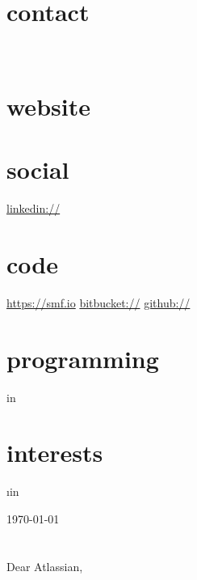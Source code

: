 \documentclass[]{fancy-cv}
\newcommand\company{Atlassian}
\begin{document}
\header{\MakeLowercase\myfirstname}{\MakeLowercase\mylastname}{\MakeLowercase\mytitle}

\begin{aside}
  \section{contact}
    \href{mailto:\myemail}{\myemail}
    ~
    \myphone
    ~
    \myaddress%
    \mycity
  \section{website}
    \href{\mywebsite}{\mywebsite}
  \section{social}
    \href{http://www.linkedin.com/in/\mylinkedin}{linkedin://\mylinkedin}
  \section{code}
    \href{https://smf.io}{https://smf.io}
    \href{https://bitbucket.org/\myfb}{bitbucket://\myfb}
    \href{https://github.com/\myfb}{github://\myfb}
  \section{programming}
     \lang in \programming {%
      \lang
    }%
  \section{interests}
     \i in \interests {%
      \MakeLowercase\i
    }%
\end{aside}

\vspace{.8em}
\large
\today\\
\\
\\
Dear \company,
\end{document}
